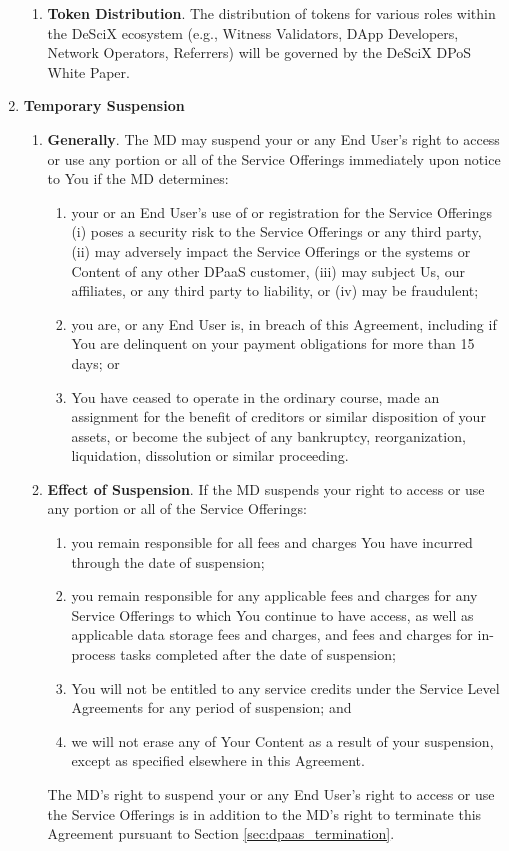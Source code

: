 \documentclass{article}
\begin{document}
\begin{enumerate}
\begin{enumerate}
        \item \textbf{Token Distribution}. The distribution of tokens for various roles within the DeSciX ecosystem (e.g., Witness Validators, DApp Developers, Network Operators, Referrers) will be governed by the DeSciX DPoS White Paper.
    \end{enumerate}
    
    \item \textbf{Temporary Suspension}

    \begin{enumerate}
        \item \textbf{Generally}. The MD may suspend your or any End User’s right to access or use any portion or all of the Service Offerings immediately upon notice to You if the MD determines:
        \begin{enumerate}
            \item your or an End User’s use of or registration for the Service Offerings (i) poses a security risk to the Service Offerings or any third party, (ii) may adversely impact the Service Offerings or the systems or Content of any other DPaaS customer, (iii) may subject Us, our affiliates, or any third party to liability, or (iv) may be fraudulent;
            \item you are, or any End User is, in breach of this Agreement, including if You are delinquent on your payment obligations for more than 15 days; or
            \item You have ceased to operate in the ordinary course, made an assignment for the benefit of creditors or similar disposition of your assets, or become the subject of any bankruptcy, reorganization, liquidation, dissolution or similar proceeding.
        \end{enumerate}

        \item \textbf{Effect of Suspension}. If the MD suspends your right to access or use any portion or all of the Service Offerings:
        \begin{enumerate}
            \item you remain responsible for all fees and charges You have incurred through the date of suspension;
            \item you remain responsible for any applicable fees and charges for any Service Offerings to which You continue to have access, as well as applicable data storage fees and charges, and fees and charges for in-process tasks completed after the date of suspension;
            \item You will not be entitled to any service credits under the Service Level Agreements for any period of suspension; and
            \item we will not erase any of Your Content as a result of your suspension, except as specified elsewhere in this Agreement.
        \end{enumerate}
        The MD's right to suspend your or any End User’s right to access or use the Service Offerings is in addition to the MD's right to terminate this Agreement pursuant to Section \ref{sec:dpaas_termination}.
    \end{enumerate}


\end{enumerate}
\end{document}
